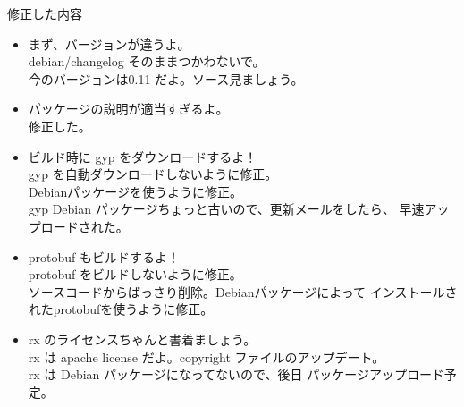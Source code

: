 \begin{frame}{修正した内容}
\end{frame}

\begin{frame}
\begin{itemize}
\item まず、バージョンが違うよ。\\
 debian/changelog そのままつかわないで。\\
 今のバージョンは0.11 だよ。ソース見ましょう。
\end{itemize}
\end{frame}

\begin{frame}
\begin{itemize}
\item パッケージの説明が適当すぎるよ。 \\
修正した。
\end{itemize}
\end{frame}

\begin{frame}
\begin{itemize}
\item ビルド時に gyp をダウンロードするよ！\\
gyp を自動ダウンロードしないように修正。\\
Debianパッケージを使うように修正。\\
gyp Debian パッケージちょっと古いので、更新メールをしたら、
早速アップロードされた。
\end{itemize}
\end{frame}

\begin{frame}
\begin{itemize}
\item protobuf もビルドするよ！\\
protobuf をビルドしないように修正。\\
ソースコードからばっさり削除。Debianパッケージによって
インストールされたprotobufを使うように修正。
\end{itemize}
\end{frame}

\begin{frame}
\begin{itemize}
\item rx のライセンスちゃんと書着ましょう。\\
rx は apache license だよ。copyright ファイルのアップデート。\\
rx は Debian パッケージになってないので、後日 パッケージアップロード予定。
\end{itemize}
\end{frame}


